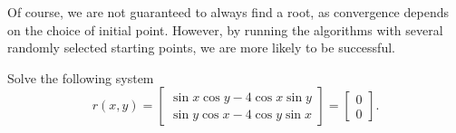 Of course, we are not guaranteed to always find a root, as convergence depends on the choice of initial point.
However, by running the algorithms with several randomly selected starting points, we are more likely to 
be successful.
\begin{problem}
Solve the following system
\[
r(x,y) = \begin{bmatrix}
\sin x\cos y - 4\cos x\sin y\\
\sin y\cos x - 4\cos y\sin x
\end{bmatrix} 
= \begin{bmatrix}
0\\
0
\end{bmatrix}.
\]
\end{problem}

\begin{comment}
\begin{problem}
Some problem involving system of nonlinear equations. Consult http://www-sop.inria.fr/coprin/logiciels/ALIAS/Benches/ 
for ideas.
\end{problem}
\end{comment}
